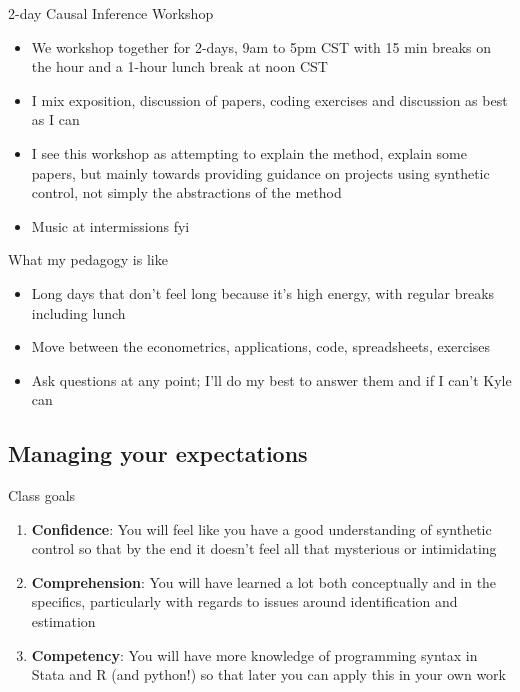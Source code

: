 \documentclass{beamer}
\begin{document}
\begin{frame}{2-day Causal Inference Workshop}

  \begin{itemize}
    \item We workshop together for 2-days, 9am to 5pm CST with 15 min breaks on the hour and a 1-hour lunch break at noon CST
    \item I mix exposition, discussion of papers, coding exercises and discussion as best as I can
    \item I see this workshop as attempting to explain the method, explain some papers, but mainly towards providing guidance on projects using synthetic control, not simply the abstractions of the method 
    \item Music at intermissions fyi
  \end{itemize}

\end{frame}

\begin{frame}{What my pedagogy is like}

\begin{itemize}
\item Long days that don't feel long because it's high energy, with regular breaks including lunch
\item Move between the econometrics, applications, code, spreadsheets, exercises
\item Ask questions at any point; I'll do my best to answer them and if I can't Kyle can
\end{itemize}

\end{frame}


\subsection{Managing your expectations}

\begin{frame}{Class goals}

  \begin{enumerate}
    \item \textbf{Confidence}: You will feel like you have a good understanding of synthetic control so that by the end it doesn't feel all that mysterious or intimidating
    \item \textbf{Comprehension}: You will have learned a lot both conceptually and in the specifics, particularly with regards to issues around identification and estimation
    \item \textbf{Competency}: You will have more knowledge of programming syntax in Stata and R (and python!) so that later you can apply this in your own work
  \end{enumerate}

\end{frame}
\end{document}
